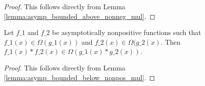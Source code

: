 \begin{proof}
    \leanok
    This follows directly from Lemma \ref{lemma:asymp_bounded_above_nonneg_mul}.
\end{proof}

\begin{lemma}
    \label{lemma:big_omega_nonpos_mul}
    \leanok
    Let $f\_1$ and $f\_2$ be asymptotically nonpositive functions such that 
    $f\_1(x) \in \Omega(g\_1(x))$ and $f\_2(x) \in \Omega(g\_2(x)$. 
    Then $f\_1(x) * f\_2(x) \in \Omega(g\_1(x) * g\_2(x))$.
\end{lemma}

\begin{proof}
    \leanok
    This follows directly from Lemma \ref{lemma:asymp_bounded_below_nonpos_mul}.
\end{proof}
